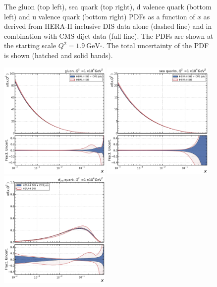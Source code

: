 \begin{figure}[tbp]
  \caption[Direct comparison of gluon and quark PDFs]{The gluon (top left), sea
  quark (top right), d valence quark (bottom left) and u valence quark (bottom
right) PDFs as a function of $x$ as derived from HERA-II inclusive DIS data
alone (dashed line) and in combination with CMS dijet data (full line). The PDFs
are shown at the starting scale $Q^2 = \SI{1.9}{\GeV \square}$. The total
uncertainty of the PDF is shown (hatched and solid bands).}
  \label{fig:pdfconstraints:direct:19}
\end{figure}

\begin{figure}[tbp]
  \centering
  \includegraphics[width=0.48\textwidth]{figures/pdf_constraints/hftd/direct/HFTD_HERACMSTDJETS_V017_EIG/pdfratio/HFTD_HERACMSTDJETS_V017_EIG_0_10000_0.pdf}\hfill%
  \includegraphics[width=0.48\textwidth]{figures/pdf_constraints/hftd/direct/HFTD_HERACMSTDJETS_V017_EIG/pdfratio/HFTD_HERACMSTDJETS_V017_EIG_9_10000_0.pdf}
  \includegraphics[width=0.48\textwidth]{figures/pdf_constraints/hftd/direct/HFTD_HERACMSTDJETS_V017_EIG/pdfratio/HFTD_HERACMSTDJETS_V017_EIG_7_10000_0.pdf}\hfill%

\end{figure}
